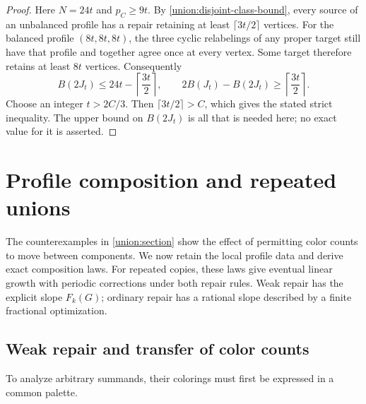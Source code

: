 \documentclass[11pt,reqno]{amsart}
\numberwithin{equation}{section}
\theoremstyle{definition}
\theoremstyle{remark}
\begin{document}
\begin{proof}
Here $N=24t$ and $p_C\ge9t$. By
\eqref{union:disjoint-class-bound}, every source of an unbalanced
profile has a repair retaining at least $\lceil3t/2\rceil$ vertices.
For the balanced profile $(8t,8t,8t)$, the three cyclic relabelings of
any proper target still have that profile and together agree once
at every vertex. Some target therefore retains at least $8t$ vertices.
Consequently
\[
 B(2J_t)\le24t-\left\lceil\frac{3t}{2}\right\rceil,
 \qquad
 2B(J_t)-B(2J_t)\ge\left\lceil\frac{3t}{2}\right\rceil.
\]
Choose an integer $t>2C/3$. Then $\lceil3t/2\rceil>C$, which gives
the stated strict inequality. The upper bound on $B(2J_t)$ is all
that is needed here; no exact value for it is asserted.
\end{proof}

\section{Profile composition and repeated unions}\label{union:composition-section}

The counterexamples in \cref{union:section} show the effect of permitting
color counts to move between components. We now retain the local profile
data and derive exact composition laws. For repeated copies, these laws
give eventual linear growth with periodic corrections under both repair
rules. Weak repair has the explicit slope $F_k(G)$; ordinary repair has
a rational slope described by a finite fractional optimization.

\subsection{Weak repair and transfer of color counts}
\label{union:weak-general}

To analyze arbitrary summands, their colorings must first be expressed
in a common palette.
\end{document}
